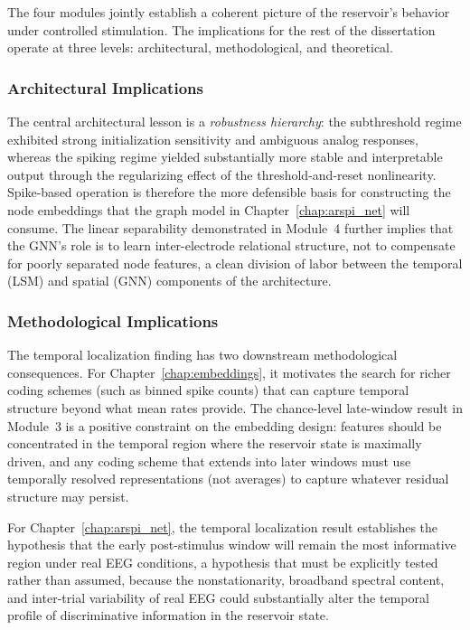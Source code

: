 The four modules jointly establish a coherent picture of the reservoir's behavior under controlled stimulation. The implications for the rest of the dissertation operate at three levels: architectural, methodological, and theoretical.

\subsubsection{Architectural Implications}

The central architectural lesson is a \emph{robustness hierarchy}: the subthreshold regime exhibited strong initialization sensitivity and ambiguous analog responses, whereas the spiking regime yielded substantially more stable and interpretable output through the regularizing effect of the threshold-and-reset nonlinearity. Spike-based operation is therefore the more defensible basis for constructing the node embeddings that the graph model in Chapter~\ref{chap:arspi_net} will consume. The linear separability demonstrated in Module~4 further implies that the GNN's role is to learn inter-electrode relational structure, not to compensate for poorly separated node features, a clean division of labor between the temporal (LSM) and spatial (GNN) components of the architecture.

\subsubsection{Methodological Implications}

The temporal localization finding has two downstream methodological consequences. For Chapter~\ref{chap:embeddings}, it motivates the search for richer coding schemes (such as binned spike counts) that can capture temporal structure beyond what mean rates provide. The chance-level late-window result in Module~3 is a positive constraint on the embedding design: features should be concentrated in the temporal region where the reservoir state is maximally driven, and any coding scheme that extends into later windows must use temporally resolved representations (not averages) to capture whatever residual structure may persist.

For Chapter~\ref{chap:arspi_net}, the temporal localization result establishes the hypothesis that the early post-stimulus window will remain the most informative region under real EEG conditions, a hypothesis that must be explicitly tested rather than assumed, because the nonstationarity, broadband spectral content, and inter-trial variability of real EEG could substantially alter the temporal profile of discriminative information in the reservoir state.


